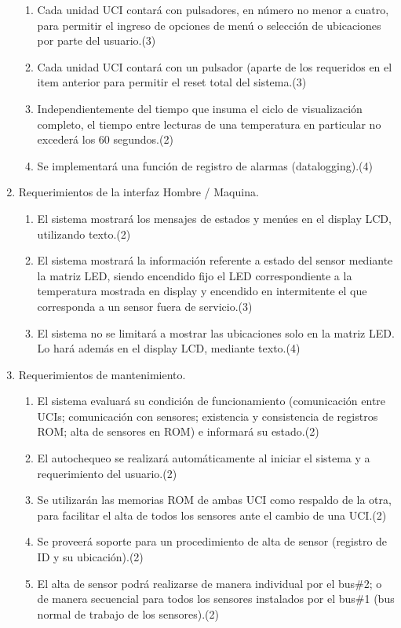 \documentclass[
11pt, %
codirector, %
]{charter}
\begin{document}
\begin{enumerate}
\begin{enumerate}
		\item Cada unidad UCI contará con pulsadores, en número no menor a cuatro, para permitir el ingreso de opciones de menú o selección de ubicaciones por parte del usuario.(3)
\item Cada unidad UCI contará con un pulsador (aparte de los requeridos en el item anterior para permitir el reset total del sistema.(3)
\item Independientemente del tiempo que insuma el ciclo de visualización completo, el tiempo entre lecturas de una temperatura en particular no excederá los 60 segundos.(2)
\item Se implementará una función de registro de alarmas (datalogging).(4)
\end{enumerate}



		\item Requerimientos de la interfaz Hombre / Maquina.
		
\begin{enumerate}
\item El sistema mostrará los mensajes de estados y menúes en el display LCD, utilizando texto.(2)
\item El sistema mostrará la información referente a estado del sensor mediante la matriz LED, siendo encendido fijo el LED correspondiente a la temperatura mostrada en display y encendido en intermitente el que corresponda a un sensor fuera de servicio.(3)
\item El sistema no se limitará a mostrar las ubicaciones solo en la matriz LED. Lo hará además en el display LCD, mediante texto.(4)
\end{enumerate}

		
		\item Requerimientos de mantenimiento.
\begin{enumerate}
\item El sistema evaluará su condición de funcionamiento (comunicación entre UCIs; comunicación con sensores; existencia y consistencia de registros ROM; alta de sensores en ROM) e informará su estado.(2)
\item El autochequeo se realizará automáticamente al iniciar el sistema y a requerimiento del usuario.(2) 
\item Se utilizarán las memorias ROM de ambas UCI como respaldo de la otra, para facilitar el alta de todos los sensores ante el cambio de una UCI.(2)
\item Se proveerá soporte para un procedimiento de alta de sensor (registro de ID y su ubicación).(2)
\item El alta de sensor podrá realizarse de manera individual por el bus\#2; o de manera secuencial para todos los sensores instalados por el bus\#1 (bus normal de trabajo de los sensores).(2) 
\end{enumerate}		


\end{enumerate}
\end{document}

